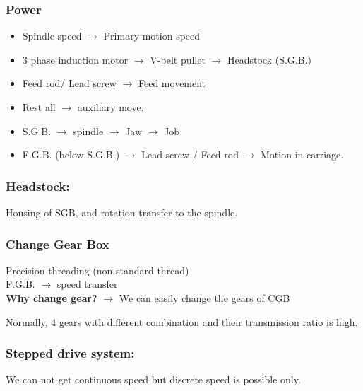 \documentclass{article}
\begin{document}
\begin{multicols}{2}
\subsubsection*{Power}
\begin{itemize}
  \item Spindle speed $\rightarrow$ Primary motion speed 
  \item 3 phase induction motor $\rightarrow$ V-belt pullet $\rightarrow$ Headstock (S.G.B.) 
  \item Feed rod/ Lead screw $\rightarrow$ Feed movement 
  \item Rest all $\rightarrow$ auxiliary move.
  \item S.G.B. $\rightarrow$ spindle $\rightarrow$ Jaw $\rightarrow$ Job 
  \item F.G.B. (below S.G.B.) $\rightarrow$ Lead screw / Feed rod $\rightarrow$ Motion in carriage. 
\end{itemize}

\subsubsection*{Headstock:}
Housing of SGB, and rotation transfer to the spindle. 

\subsubsection*{Change Gear Box}
Precision threading (non-standard thread)\\
F.G.B. $\rightarrow$ speed transfer \\

\textbf{Why change gear?} 
$\rightarrow$ We can easily change the gears of CGB 

Normally, 4 gears with different combination and their transmission ratio is high. 

\subsubsection*{Stepped drive system:}
We can not get continuous speed but discrete speed is possible only. 


\end{multicols}
\end{document}
